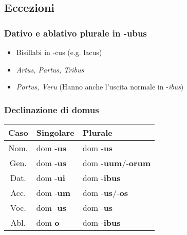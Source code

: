 \subsection{Eccezioni}
\subsubsection*{Dativo e ablativo plurale in -ubus}
\begin{itemize}
    \item Bisillabi in -cus (e.g. lacus)
    \item \textit{Artus, Partus, Tribus}
    \item \textit{Portus, Veru} (Hanno anche l'uscita normale in -\textit{ibus})
\end{itemize}

\subsubsection*{Declinazione di domus}
\begin{table}[h!]
    \centering
    \begin{tabular}{|c|l|l|}
        \hline
        \textbf{Caso} & \textbf{Singolare} & \textbf{Plurale} \\
        \hline
        Nom. & dom -\textbf{us} & dom -\textbf{us} \\
        \hline
        Gen. & dom -\textbf{us} & dom -\textbf{uum}/-\textbf{orum} \\
        \hline
        Dat. & dom -\textbf{ui} & dom -\textbf{ibus} \\
        \hline
        Acc. & dom -\textbf{um} & dom -\textbf{us}/-\textbf{os} \\
        \hline
        Voc. & dom -\textbf{us} & dom -\textbf{us} \\
        \hline
        Abl. & dom \textbf{o}   & dom -\textbf{ibus} \\
        \hline
    \end{tabular}
\end{table}

